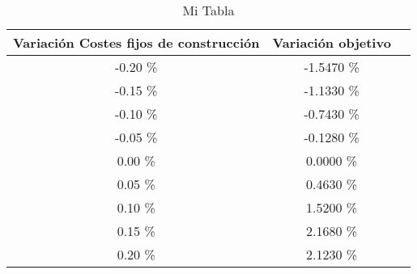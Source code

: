 \begin{table}
\centering
\begin{tabular}{|c|c|c|}
\hline
 Variación Costes fijos de construcción & Variación objetivo \\ \hline
-0.20 \% & -1.5470 \% \\ \hline
-0.15 \% & -1.1330 \% \\ \hline
-0.10 \% & -0.7430 \% \\ \hline
-0.05 \% & -0.1280 \% \\ \hline
0.00 \% & 0.0000 \% \\ \hline
0.05 \% & 0.4630 \% \\ \hline
0.10 \% & 1.5200 \% \\ \hline
0.15 \% & 2.1680 \% \\ \hline
0.20 \% & 2.1230 \% \\ \hline
\end{tabular}
\caption{Mi Tabla}
\end{table}
